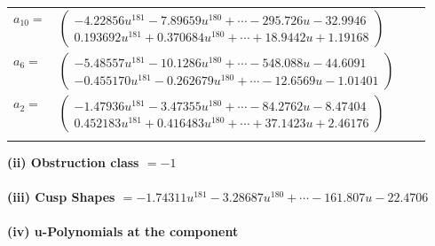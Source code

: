 \documentclass[1p]{elsarticle_modified}
\theoremstyle{definition}
\begin{document}
\begin{tabular}{m{7pt} m{180pt} m{7pt} m{180pt} }
\flushright $a_{10}=$&$\begin{pmatrix}-4.22856 u^{181}-7.89659 u^{180}+\cdots-295.726 u-32.9946\\0.193692 u^{181}+0.370684 u^{180}+\cdots+18.9442 u+1.19168\end{pmatrix}$ \\
\flushright $a_{6}=$&$\begin{pmatrix}-5.48557 u^{181}-10.1286 u^{180}+\cdots-548.088 u-44.6091\\-0.455170 u^{181}-0.262679 u^{180}+\cdots-12.6569 u-1.01401\end{pmatrix}$ \\
\flushright $a_{2}=$&$\begin{pmatrix}-1.47936 u^{181}-3.47355 u^{180}+\cdots-84.2762 u-8.47404\\0.452183 u^{181}+0.416483 u^{180}+\cdots+37.1423 u+2.46176\end{pmatrix}$\\&\end{tabular}
\flushleft \textbf{(ii) Obstruction class $= -1$}\\~\\
\flushleft \textbf{(iii) Cusp Shapes $= -1.74311 u^{181}-3.28687 u^{180}+\cdots-161.807 u-22.4706$}\\~\\
\newpage\renewcommand{\arraystretch}{1}
\flushleft \textbf{(iv) u-Polynomials at the component}\newline \\
\end{document}
